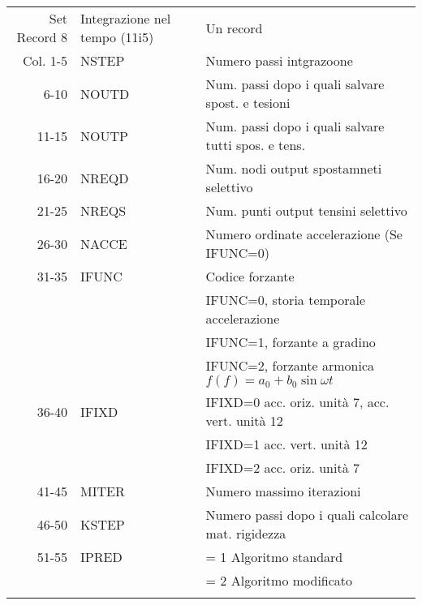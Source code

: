 \begin{tabular}{rll}
	Set Record 8 & Integrazione nel tempo (11i5)  & Un record                                         \\
	Col.  1-5    & NSTEP                          & Numero passi intgrazoone                          \\
	6-10    & NOUTD                          & Num. passi dopo i quali salvare spost. e tesioni  \\
	11-15    & NOUTP                          & Num. passi dopo i quali salvare tutti spos. e tens.\\
	16-20    & NREQD                          & Num. nodi output spostamneti selettivo            \\
	21-25    & NREQS                          & Num. punti output tensini selettivo               \\
	26-30    & NACCE                          & Numero ordinate accelerazione (Se IFUNC=0)        \\
	31-35    & IFUNC                          & Codice forzante                                   \\
	&                                & IFUNC=0, storia temporale accelerazione           \\
	&                                & IFUNC=1, forzante a gradino                       \\
	&                                & IFUNC=2, forzante armonica $f(f)=a_0+b_0\sin\omega t$\\
	36-40    & IFIXD                          & IFIXD=0 acc. oriz. unità 7, acc. vert. unità 12   \\
	&                                & IFIXD=1 acc. vert. unità 12                       \\
	&                                & IFIXD=2 acc. oriz. unità 7                        \\
	41-45    & MITER                          & Numero massimo iterazioni                         \\
	46-50    & KSTEP                          & Numero passi dopo i quali calcolare mat. rigidezza\\
	51-55    & IPRED                          & = 1 Algoritmo standard                            \\
	&                                & = 2 Algoritmo modificato                          \\
	&                                &                                                   \\
\end{tabular}

